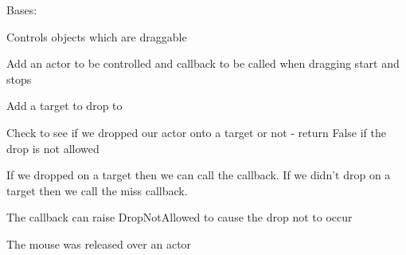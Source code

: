 \documentclass[letterpaper,10pt,english]{sphinxmanual}
\begin{document}
\begin{fulllineitems}
\label{blocks:serge.blocks.dragndrop.DragController}
Bases: {\hyperref[blocks:serge.blocks.actors.ScreenActor]{}}

Controls objects which are draggable

\begin{fulllineitems}
\label{blocks:serge.blocks.dragndrop.DragController.addActor}
Add an actor to be controlled and callback to be called when dragging start and stops

\end{fulllineitems}


\begin{fulllineitems}
\label{blocks:serge.blocks.dragndrop.DragController.addDropTarget}
Add a target to drop to

\end{fulllineitems}


\begin{fulllineitems}
\label{blocks:serge.blocks.dragndrop.DragController.checkForDrops}
Check to see if we dropped our actor onto a target or not - return False if the drop is not allowed

If we dropped on a target then we can call the callback. If
we didn't drop on a target then we call the miss callback.

The callback can raise DropNotAllowed to cause the drop not to occur

\end{fulllineitems}


\begin{fulllineitems}
\label{blocks:serge.blocks.dragndrop.DragController.clickedActor}
The mouse was released over an actor


\end{fulllineitems}
\end{fulllineitems}
\end{document}
